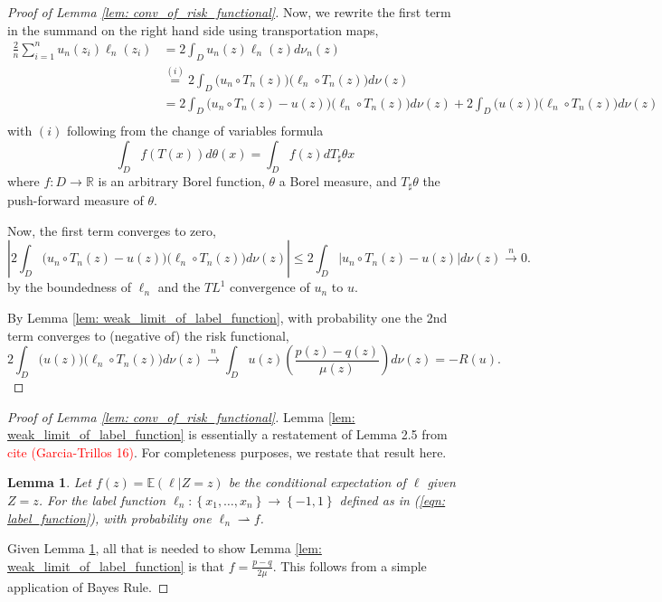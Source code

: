 \documentclass{article}
\newcommand{\Reals}{\mathbb{R}}
\newcommand{\abs}[1]{\left \lvert #1 \right \rvert}
\newcommand{\set}[1]{\left\{#1\right\}}
\theoremstyle{alden}
\theoremstyle{aldenthm}
\newtheorem{lemma}{Lemma}
\theoremstyle{remark}
\begin{document}
\begin{proof}[Proof of Lemma \ref{lem: conv_of_risk_functional}]
	Now, we rewrite the first term in the summand on the right hand side using transportation maps,
	\begin{align*}
	\frac{2}{n} \sum_{i = 1}^{n} u_n(z_i) \ell_n(z_i) & = 2 \int_D u_n(z) \ell_n(z) d\nu_n(z) \\
	& \overset{(i)}{=} 2 \int_D  \bigl(u_n \circ T_n (z) \bigr) \bigl( \ell_n \circ T_n (z)  \bigr) d\nu(z) \\
	& = 2 \int_D  \bigl(u_n \circ T_n (z)  - u(z) \bigr) \bigl( \ell_n \circ T_n (z)  \bigr) d\nu(z) + 2 \int_D  \bigl(u(z) \bigr) \bigl( \ell_n \circ T_n (z)  \bigr) d\nu(z) \\
	\end{align*}
	with $(i)$ following from the change of variables formula
	\begin{equation*}
	\int_D f(T(x)) d \theta(x) = \int_D f(z) d T_{\sharp} \theta x
	\end{equation*}
	where $f: D \to \Reals$ is an arbitrary Borel function, $\theta$ a Borel measure, and $T_{\sharp} \theta$ the push-forward measure of $\theta$. 
	
	Now, the first term converges to zero,
	\begin{equation*}
	\abs{2 \int_D  \bigl(u_n \circ T_n (z)  - u(z) \bigr) \bigl( \ell_n \circ T_n (z)  \bigr) d\nu(z)} \leq 2 \int_D \abs{u_n \circ T_n (z)  - u(z)} d\nu(z) \overset{n}{\to} 0.
	\end{equation*}
	by the boundedness of $\ell_n$ and the $TL^1$ convergence of $u_n$ to $u$.
	
	By Lemma \ref{lem: weak_limit_of_label_function}, with probability one the 2nd term converges to (negative of) the risk functional,
	\begin{equation*}
	2 \int_D  \bigl(u(z) \bigr) \bigl( \ell_n \circ T_n (z)  \bigr) d\nu(z) \overset{n}{\to} \int_D u(z) \left(\frac{p(z) - q(z)}{\mu(z)}\right) d\nu(z) = -R(u).
	\end{equation*}
\end{proof}

\begin{proof}[Proof of Lemma \ref{lem: conv_of_risk_functional}]
	Lemma \ref{lem: weak_limit_of_label_function} is essentially a restatement of Lemma 2.5 from \textcolor{red}{cite (Garcia-Trillos 16)}. For completeness purposes, we restate that result here.
	
	\begin{lemma}
		\label{lem: weak_conv_label_function}
		Let $f(z) = \mathbb{E}(\ell \vert Z = z)$ be the conditional expectation of $\ell$ given $Z = z$.  
		For the label function $\ell_n: \set{x_1, \ldots, x_n} \to \set{-1,1}$ defined as in (\ref{eqn: label_function}), with probability one $\ell_n \rightharpoonup f$.
	\end{lemma}
	Given Lemma \ref{lem: weak_conv_label_function}, all that is needed to show Lemma \ref{lem: weak_limit_of_label_function} is that $f = \frac{p - q}{2\mu}$. This follows from a simple application of Bayes Rule. 
\end{proof}
	
\end{document}
